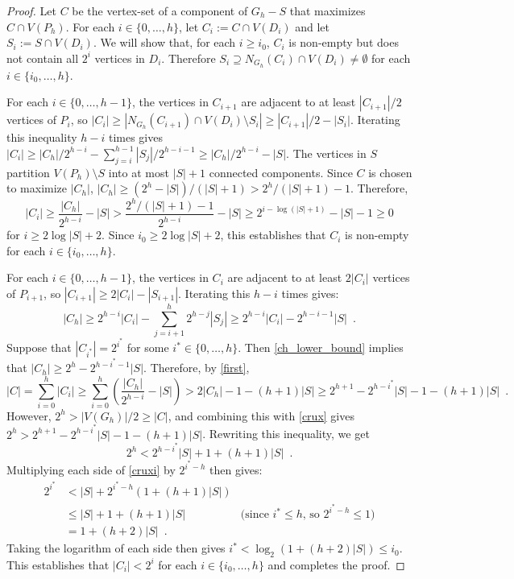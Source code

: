\documentclass{patmorin}
\renewcommand{\le}{\leqslant}
\renewcommand{\ge}{\geqslant}
\begin{document}
\begin{proof}
  Let $C$ be the vertex-set of a component of $G_h-S$ that maximizes $C\cap V(P_h)$. For each $i\in\{0,\ldots,h\}$, let $C_i:=C\cap V(D_i)$ and let $S_i:=S\cap V(D_i)$. We will show that, for each $i\ge i_0$, $C_i$ is non-empty but does not contain all $2^i$ vertices in $D_i$.  Therefore $S_i\supseteq N_{G_h}(C_i)\cap V(D_i)\neq\emptyset$ for each $i\in\{i_0,\ldots,h\}$.

  For each $i\in\{0,\ldots,h-1\}$, the vertices in $C_{i+1}$ are adjacent to at least $|C_{i+1}|/2$ vertices of $P_{i}$, so $|C_i|\ge |N_{G_h}(C_{i+1})\cap V(D_i)\setminus S_i| \ge |C_{i+1}|/2 - |S_i|$.  Iterating this inequality $h-i$ times gives $|C_i|\ge |C_h|/2^{h-i}-\sum_{j=i}^{h-1}|S_j|/2^{h-i-1}\ge |C_h|/2^{h-i}-|S|$.  The vertices in $S$ partition $V(P_h)\setminus S$ into at most $|S|+1$ connected components.  Since $C$ is chosen to maximize $|C_h|$, $|C_h| \ge (2^h-|S|)/(|S|+1) > 2^{h}/(|S|+1) - 1$.  Therefore,
  \begin{equation}
    |C_i|\ge \frac{|C_h|}{2^{h-i}} - |S| > \frac{2^h/(|S|+1)-1}{2^{h-i}} - |S|
    \ge 2^{i-\log(|S|+1)}-|S|-1 \ge 0 \label{first}
  \end{equation}
  for $i\ge 2\log |S|+2$.  Since $i_0\ge 2\log |S|+2$, this establishes that $C_i$ is non-empty for each $i\in\{i_0,\ldots,h\}$.

  For each $i\in\{0,\ldots,h-1\}$, the vertices in $C_i$ are adjacent to at least $2|C_i|$ vertices of $P_{i+1}$, so $|C_{i+1}|\ge 2|C_i|-|S_{i+1}|$.  Iterating this $h-i$ times gives:
  \begin{equation}
    |C_h| \ge 2^{h-i}|C_i| - \sum_{j=i+1}^h 2^{h-j}|S_j| \ge 2^{h-i}|C_i| - 2^{h-i-1}|S| \enspace . \label{ch_lower_bound}
  \end{equation}
  Suppose that $|C_{i^*}|=2^{i^*}$ for some $i^*\in\{0,\ldots,h\}$. Then \cref{ch_lower_bound} implies that $|C_h|\ge 2^h-2^{h-i^*-1}|S|$.  Therefore, by \cref{first},
  \begin{equation}
      |C|
         =\sum_{i=0}^h |C_i| \ge \sum_{i=0}^h\left(\frac{|C_h|}{2^{h-i}} - |S|\right)
       > 2|C_h| - 1 -(h+1)|S|
       \ge 2^{h+1}-2^{h-i^*}|S|-1 - (h+1)|S| \enspace .  \label{crux}
  \end{equation}
  However, $2^h > |V(G_h)|/2 \ge |C|$, and combining this with \cref{crux} gives $2^h > 2^{h+1} - 2^{h-i^*}|S|-1-(h+1)|S|$.
  Rewriting this inequality, we get
  \begin{equation}
     2^h < 2^{h-i^*}|S|+ 1 + (h+1)|S| \enspace . \label{cruxi}
  \end{equation}
  Multiplying each side of \cref{cruxi} by $2^{i^*-h}$ then gives:
  \begin{align*}
    2^{i^*} & <  |S| + 2^{i^*-h}(1+(h+1)|S|) \\
            & \le |S| + 1 + (h+1)|S| & \text{(since $i^*\le h$, so $2^{i^*-h}\le 1$)} \\
            & = 1+ (h+2)|S| \enspace .
  \end{align*}
  Taking the logarithm of each side then gives $i^* < \log_2(1+(h+2)|S|)\le i_0$.  This establishes that $|C_i|< 2^i$ for each $i\in\{i_0,\ldots,h\}$ and  completes the proof.
\end{proof}
\end{document}
